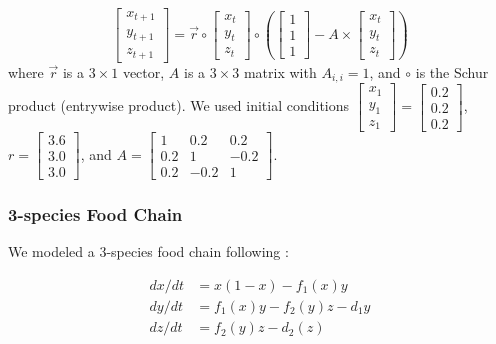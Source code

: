 \begin{equation}
\label{eqn_coupled_map}
\begin{bmatrix}
x_{t+1}\\
y_{t+1}\\
z_{t+1} \end{bmatrix} = \vec{r} \circ 
\begin{bmatrix}
x_t\\
y_t\\
z_t \end{bmatrix} \circ 
\left(
\begin{bmatrix}
1\\
1\\
1 \end{bmatrix}
- A \times 
\begin{bmatrix}
x_t\\
y_t\\
z_t \end{bmatrix}
\right)
\end{equation}
where $\vec{r}$ is a $3 \times 1$ vector, $A$ is a $3 \times 3$ matrix with $A_{i, i} = 1$, and $\circ$ is the Schur product (entrywise product). We used initial conditions $\begin{bmatrix}
x_1\\
y_1\\
z_1 \end{bmatrix} = 
\begin{bmatrix}
0.2\\
0.2\\
0.2 \end{bmatrix}$, $r = \begin{bmatrix}
3.6\\
3.0\\
3.0 \end{bmatrix}$, and $A = \begin{bmatrix}
1 & 0.2 & 0.2\\
0.2 & 1 & -0.2\\
0.2 & -0.2 & 1 \end{bmatrix}$.

\subsubsection{3-species Food Chain}

We modeled a 3-species food chain following \cite{Hastings_1991}:

\begin{equation}
\label{eqn_3sp_food_chain}
\begin{array}{rl}
dx/dt &= x(1-x)-f_1(x)y\\
dy/dt &= f_1(x)y - f_2(y)z - d_1y\\
dz/dt &= f_2(y)z - d_2(z)
\end{array}
\end{equation}

